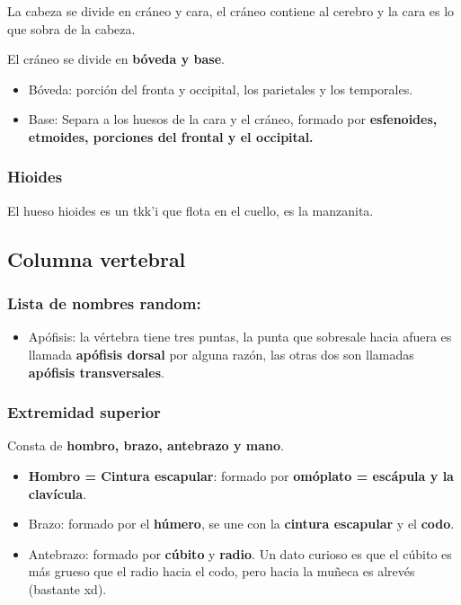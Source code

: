 \documentclass{article}
\begin{document}
La cabeza se divide en cráneo y cara, el cráneo contiene al cerebro y la
cara es lo que sobra de la cabeza.

El cráneo se divide en \textbf{bóveda y base}.

\begin{itemize}
  \item Bóveda: porción del fronta y occipital, los parietales y los temporales.
  \item Base: Separa a los huesos de la cara y el cráneo, formado por \textbf{esfenoides,
    etmoides, porciones del frontal y el occipital.}

\end{itemize}

\subsubsection{Hioides}
El hueso hioides es un tkk'i que flota en el cuello, es la manzanita.

\subsection{Columna vertebral}
\subsubsection{Lista de nombres random:}

\begin{itemize}
  \item Apófisis: la vértebra tiene tres puntas, la punta que sobresale hacia
    afuera es llamada \textbf{apófisis dorsal} por alguna razón, las otras 
    dos son llamadas \textbf{apófisis transversales}.

\end{itemize}

\subsubsection{Extremidad superior}
Consta de \textbf{hombro, brazo, antebrazo y mano}. 

\begin{itemize}
  \item \textbf{Hombro = Cintura escapular}: formado por \textbf{omóplato = escápula y la clavícula}. 
  \item Brazo: formado por el \textbf{húmero}, se une con la \textbf{cintura escapular} y el \textbf{codo}.
\item Antebrazo: formado por \textbf{cúbito} y \textbf{radio}. Un dato curioso es que el cúbito es 
  más grueso que el radio hacia el codo, pero hacia la muñeca es alrevés (bastante xd).
\end{itemize}
\end{document}

